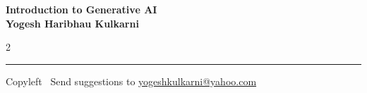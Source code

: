 \documentclass[8pt,landscape]{article}
\begin{document}
\footnotesize


\begin{center}
\Large{\textbf{Introduction to Generative AI\\ Yogesh Haribhau Kulkarni}}  
\end{center}

\begin{multicols}{2}

\end{multicols}

\rule{\linewidth}{0.25pt}
\scriptsize
Copyleft \textcopyleft\  Send suggestions to 
\href{http://www.yogeshkulkarni.com}{yogeshkulkarni@yahoo.com}
\end{document}
